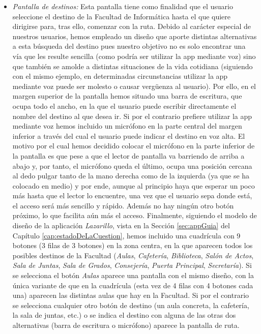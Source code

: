 \begin{itemize}
	\item \textit{Pantalla de destinos:} Esta pantalla tiene como finalidad que el usuario seleccione el destino de la Facultad de Informática hasta el que quiere dirigirse para, tras ello, comenzar con la ruta. Debido al carácter especial de nuestros usuarios, hemos empleado un diseño que aporte distintas alternativas a esta búsqueda del destino pues nuestro objetivo no es solo encontrar una vía que les resulte sencilla (como podría ser utilizar la app mediante voz) sino que también se amolde a distintas situaciones de la vida cotidiana (siguiendo con el mismo ejemplo, en determinadas circunstancias utilizar la app mediante voz puede ser molesto o causar vergüenza al usuario). Por ello, en el margen superior de la pantalla hemos situado una barra de escritura, que ocupa todo el ancho, en la que el usuario puede escribir directamente el nombre del destino al que desea ir. Si por el contrario prefiere utilizar la app mediante voz hemos incluido un micrófono en la parte central del margen inferior a través del cual el usuario puede indicar el destino en voz alta. El motivo por el cual hemos decidido colocar el micrófono en la parte inferior de la pantalla es que pese a que el lector de pantalla va barriendo de arriba a abajo y, por tanto, el micrófono queda el último, ocupa una posición cercana al dedo pulgar tanto de la mano derecha como de la izquierda (ya que se ha colocado en medio) y por ende, aunque al principio haya que esperar un poco más hasta que el lector lo encuentre, una vez que el usuario sepa donde está, el acceso será más sencillo y rápido. Además no hay ningún otro botón próximo, lo que facilita aún más el acceso. Finalmente, siguiendo el modelo de diseño de la aplicación \textit{Lazarillo}, vista en la Sección \ref{sec:appGuia} del Capítulo \ref{cap:estadoDeLaCuestion}, hemos incluido una cuadrícula con 9 botones (3 filas de 3 botones) en la zona centra, en la que aparecen todos los posibles destinos de la Facultad (\textit{Aulas}, \textit{Cafetería}, \textit{Biblioteca}, \textit{Salón de Actos}, \textit{Sala de Juntas}, \textit{Sala de Grados}, \textit{Consejería},\textit{ Puerta Principal}, \textit{Secretaría}). Si se selecciona el botón \textit{Aulas} aparece una pantalla con el mismo diseño, con la única variante de que en la cuadrícula (esta vez de 4 filas con 4 botones cada una) aparecen las distintas aulas que hay en la Facultad. Si por el contrario se selecciona cualquier otro botón de destino (un aula concreta, la cafetería, la sala de juntas, etc.) o se indica el destino con alguna de las otras dos alternativas (barra de escritura o micrófono) aparece la pantalla de ruta.
	

\end{itemize}
